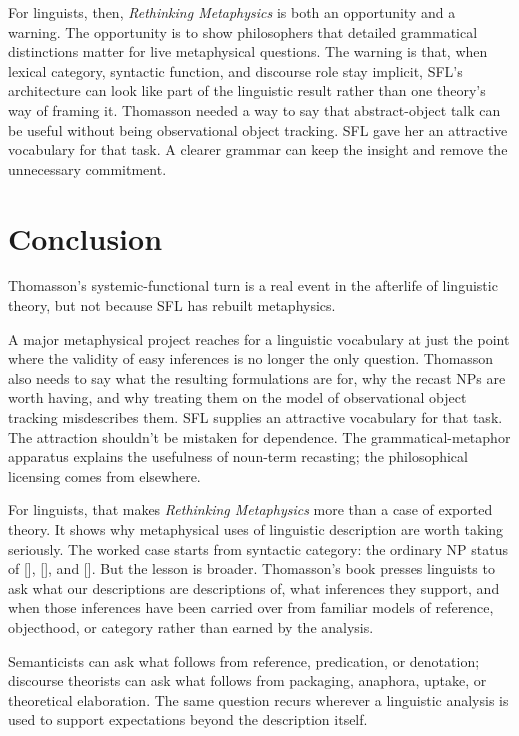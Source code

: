 \documentclass[12pt]{article}
\begin{document}
For linguists, then, \emph{Rethinking Metaphysics} is both an opportunity and a warning. The opportunity is to show philosophers that detailed grammatical distinctions matter for live metaphysical questions. The warning is that, when lexical category, syntactic function, and discourse role stay implicit, SFL's architecture can look like part of the linguistic result rather than one theory's way of framing it. Thomasson needed a way to say that abstract-object talk can be useful without being observational object tracking. SFL gave her an attractive vocabulary for that task. A clearer grammar can keep the insight and remove the unnecessary commitment.

\section{Conclusion}
Thomasson's systemic-functional turn is a real event in the afterlife of linguistic theory, but not because SFL has rebuilt metaphysics.

A major metaphysical project reaches for a linguistic vocabulary at just the point where the validity of easy inferences is no longer the only question. Thomasson also needs to say what the resulting formulations are for, why the recast NPs are worth having, and why treating them on the model of observational object tracking misdescribes them. SFL supplies an attractive vocabulary for that task. The attraction shouldn't be mistaken for dependence. The grammatical-metaphor apparatus explains the usefulness of noun-term recasting; the philosophical licensing comes from elsewhere.

For linguists, that makes \emph{Rethinking Metaphysics} more than a case of exported theory. It shows why metaphysical uses of linguistic description are worth taking seriously. The worked case starts from syntactic category: the ordinary NP status of [], [], and []. But the lesson is broader. Thomasson's book presses linguists to ask what our descriptions are descriptions of, what inferences they support, and when those inferences have been carried over from familiar models of reference, objecthood, or category rather than earned by the analysis.

Semanticists can ask what follows from reference, predication, or denotation; discourse theorists can ask what follows from packaging, anaphora, uptake, or theoretical elaboration. The same question recurs wherever a linguistic analysis is used to support expectations beyond the description itself.
\end{document}
